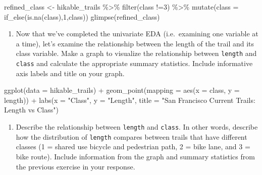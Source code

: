 \documentclass[
]{article}
\newenvironment{Shaded}{\begin{snugshade}}{\end{snugshade}}
\newcommand{\AttributeTok}[1]{\textcolor[rgb]{0.77,0.63,0.00}{#1}}
\newcommand{\DecValTok}[1]{\textcolor[rgb]{0.00,0.00,0.81}{#1}}
\newcommand{\FunctionTok}[1]{\textcolor[rgb]{0.00,0.00,0.00}{#1}}
\newcommand{\NormalTok}[1]{#1}
\newcommand{\OtherTok}[1]{\textcolor[rgb]{0.56,0.35,0.01}{#1}}
\newcommand{\SpecialCharTok}[1]{\textcolor[rgb]{0.00,0.00,0.00}{#1}}
\newcommand{\StringTok}[1]{\textcolor[rgb]{0.31,0.60,0.02}{#1}}
\providecommand{\tightlist}{%
  \setlength{\itemsep}{0pt}\setlength{\parskip}{0pt}}
\begin{document}
\begin{Shaded}
\begin{Highlighting}[]
\NormalTok{refined\_class }\OtherTok{\textless{}{-}}\NormalTok{ hikable\_trails }\SpecialCharTok{\%\textgreater{}\%} \FunctionTok{filter}\NormalTok{(class }\SpecialCharTok{!=}\DecValTok{3}\NormalTok{) }\SpecialCharTok{\%\textgreater{}\%} 
  \FunctionTok{mutate}\NormalTok{(}\AttributeTok{class =} \FunctionTok{if\_else}\NormalTok{(}\FunctionTok{is.na}\NormalTok{(class),}\DecValTok{1}\NormalTok{,class)) }
\FunctionTok{glimpse}\NormalTok{(refined\_class)}
\end{Highlighting}
\end{Shaded}

\begin{enumerate}
\def\labelenumi{\arabic{enumi}.}
\setcounter{enumi}{9}
\tightlist
\item
  Now that we've completed the univariate EDA (i.e.~examining one
  variable at a time), let's examine the relationship between the length
  of the trail and its class variable. Make a graph to visualize the
  relationship between \texttt{length} and \texttt{class} and calculate
  the appropriate summary statistics. Include informative axis labels
  and title on your graph.
\end{enumerate}

\begin{Shaded}
\begin{Highlighting}[]
\FunctionTok{ggplot}\NormalTok{(}\AttributeTok{data =}\NormalTok{ hikable\_trails) }\SpecialCharTok{+}
  \FunctionTok{geom\_point}\NormalTok{(}\AttributeTok{mapping =} \FunctionTok{aes}\NormalTok{(}\AttributeTok{x =}\NormalTok{ class, }\AttributeTok{y =}\NormalTok{ length)) }\SpecialCharTok{+} 
  \FunctionTok{labs}\NormalTok{(}\AttributeTok{x =} \StringTok{"Class"}\NormalTok{, }
       \AttributeTok{y =} \StringTok{"Length"}\NormalTok{, }
       \AttributeTok{title =} \StringTok{"San Francisco Current Trails: Length vs Class"}\NormalTok{)}
\end{Highlighting}
\end{Shaded}

\begin{enumerate}
\def\labelenumi{\arabic{enumi}.}
\setcounter{enumi}{10}
\tightlist
\item
  Describe the relationship between \texttt{length} and \texttt{class}.
  In other words, describe how the distribution of \texttt{length}
  compares between trails that have different classes (1 = shared use
  bicycle and pedestrian path, 2 = bike lane, and 3 = bike route).
  Include information from the graph and summary statistics from the
  previous exercise in your response.
\end{enumerate}
\end{document}
